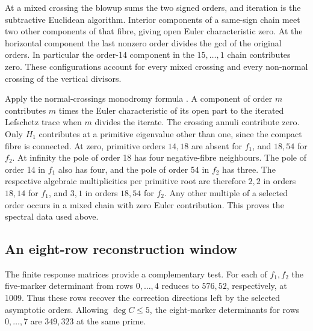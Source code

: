 \documentclass[11pt]{article}
\begin{document}
At a mixed crossing the blowup sums the two signed
orders, and iteration is the subtractive Euclidean
algorithm. Interior components of a same-sign chain
meet two other components of that fibre, giving open
Euler characteristic zero. At the horizontal
component the last nonzero order divides the gcd
of the original orders. In particular the order-14
component in the \(15,\ldots,1\) chain contributes
zero. These configurations account for every mixed
crossing and every non-normal crossing of the
vertical divisors.

Apply the normal-crossings monodromy formula
\cite[\S2 and Theorem~3]{acampo}. A component of
order \(m\) contributes \(m\) times the Euler
characteristic of its open part to the iterated
Lefschetz trace when \(m\) divides the iterate.
The crossing annuli contribute zero. Only
\(H_1\) contributes at a primitive eigenvalue other
than one, since the compact fibre is connected.
At zero, primitive orders \(14,18\) are absent
for \(f_1\), and \(18,54\) for \(f_2\).
At infinity the pole of order 18 has four
negative-fibre neighbours. The pole of order 14
in \(f_1\) also has four, and the pole of order 54
in \(f_2\) has three. The respective algebraic
multiplicities per primitive root are therefore
\(2,2\) in orders \(18,14\) for \(f_1\), and
\(3,1\) in orders \(18,54\) for \(f_2\).
Any other multiple of a selected order occurs
in a mixed chain with zero Euler contribution.
This proves the spectral data used above.

\subsection{An eight-row reconstruction window}

The finite response matrices provide a complementary
test. For each of \(f_1,f_2\) the five-marker determinant
from rows \(0,\ldots,4\) reduces to \(576,52\), respectively,
at 1009. Thus these rows recover the correction directions
left by the selected asymptotic orders. Allowing \(\deg C\le5\),
the eight-marker determinants for rows \(0,\ldots,7\) are
\(349,323\) at the same prime.
\end{document}
